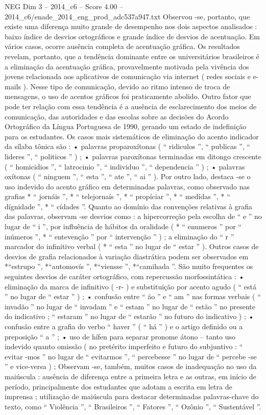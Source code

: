 \begin{textsample}{NEG Dim 3 – 2014\_c6 – Score 4.00 – 2014\_c6/enade\_2014\_eng\_prod\_adc537a947.txt}
Observou -se, portanto, que existe uma diferença muito grande de desempenho nos dois aspectos analisados : baixo índice de desvios ortográficos e grande índice de desvios de acentuação.
Em vários casos, ocorre ausência completa de acentuação gráfica.
Os resultados revelam, portanto, que a tendência dominante entre os universitários brasileiros é a eliminação da acentuação gráfica, provavelmente motivada pela vivência dos jovens relacionada aos aplicativos de comunicação via internet ( redes sociais e e-mails ).
Nesse tipo de comunicação, devido ao ritmo intenso de troca de mensagens, o uso de acentos gráficos foi praticamente abolido.
Outro fator que pode ter relação com essa tendência é a ausência de esclarecimento dos meios de comunicação, das autoridades e das escolas sobre as decisões do Acordo Ortográfico da Língua Portuguesa de 1990, gerando um estado de indefinição para os estudantes.
Os casos mais sistemáticos de eliminação do acento indicador da sílaba tônica são : • palavras proparoxítonas ( “ ridiculos ”, “ publicas ”, “ lideres ”, “ politicos ” ) ; • palavras paroxítonas terminadas em ditongo crescente ( “ homicidios ”, “ latrocinio ”, “ individuo ”, “ dependencia ” ) ; • palavras oxítonas ( “ ninguem ”, “ esta ”, “ ate ”, “ ai ” ).
Por outro lado, destaca -se o uso indevido do acento gráfico em determinadas palavras, como observado nas grafias * “ jornáis ”, * “ telejornaís ”, * “ propíciar ”, * “ medídas ”, * “ dígnidade ”, * “ cídades ”.
Quanto ao domínio das convenções relativas à grafia das palavras, observam -se desvios como : a hipercorreção pela escolha de “ e ” no lugar de “ i ”, por influência de hábitos da oralidade ( * “ enumeros ” por “ inúmeros ”, * “ entevenção ” por “ intervenção ” ) ; a eliminação do “ r ” marcador do infinitivo verbal ( * “ esta ” no lugar de “ estar ” ).
Outros casos de desvios de grafia relacionados à variação diastrática podem ser observados em *“estrupo ”, *“automovís ”, *“viensse ”, *“camihada ”.
São muito frequentes os seguintes desvios de caráter ortográfico, com repercussão morfossintática : • eliminação da marca de infinitivo ( -r- ) e substituição por acento agudo ( “ está ” no lugar de “ estar ” ) ; • confusão entre “ ão ” e “ am ” nas formas verbais ( “ invadão ” no lugar de “ invadam ” e “ estam ” no lugar de “ estão ” no presente do indicativo ; “ estaram ” no lugar de “ estarão ” no futuro do indicativo ) ; • confusão entre a grafia do verbo “ haver ” ( “ há ” ) e o artigo definido ou a preposição “ a ” ; • uso de hífen para separar pronome átono – tanto uso indevido quanto omissão ( no pretérito imperfeito e futuro do subjuntivo : “ evitar -mos ” no lugar de “ evitarmos ”, “ percebesse ” no lugar de “ percebe -se ” e vice-versa ) ; Observam -se, também, muitos casos de inadequação no uso da maiúscula : ausência de diferença entre a primeira letra e as outras, em início de período, principalmente dos estudantes que adotam a escrita em letra de imprensa ; utilização de maiúscula para destacar determinadas palavras-chave do texto, como “ Violência ”, “ Brasileiros ”, “ Fatores ”, “ Ozônio ”, “ Sustentável ”.

\end{textsample}
